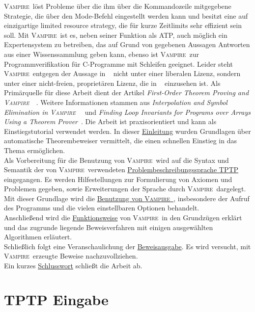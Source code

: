 \documentclass{article}
\newcommand{\vampire}{\textsc{Vampire}~}
\begin{document}
\vampire löst Probleme über die ihm über die Kommandozeile mitgegebene Strategie, die über den Mode-Befehl eingestellt werden kann und besitzt eine auf einzigartige limited resource strategy, die für kurze Zeitlimits sehr effizient sein soll. Mit \vampire ist es, neben seiner Funktion als ATP, auch möglich ein Expertensystem zu betreiben, das auf Grund von gegebenen Aussagen Antworten aus einer Wissenssammlung geben kann, ebenso ist \vampire zur Programmverifikation für C-Programme mit Schleifen geeignet. 
Leider steht \vampire entgegen der Aussage in ~\cite{cav2013} nicht unter einer liberalen Lizenz, sondern unter einer nicht-freien, proprietären Lizenz, die in ~\cite{vampirehp} einzusehen ist.
Als Primärquelle für diese Arbeit dient der Artikel \textit{First-Order Theorem Proving and \vampire}~\cite{cav2013}.
Weitere Informationen stammen aus \textit{Interpolation and Symbol Elimination in \vampire}~\cite{hoder2010} 
und \textit{Finding Loop Invariants for Programs over Arrays Using a Theorem Prover}~\cite{kovacs2009finding}.
Die Arbeit ist praxisorientiert und kann als Einstiegstutorial verwendet werden.
In dieser \hyperref[sec:introduction]{Einleitung} wurden Grundlagen über automatische Theorembeweiser vermittelt, die einen schnellen Einstieg in das Thema ermöglichen.\\
Als Vorbereitung für die Benutzung von \vampire wird auf die Syntax und Semantik der von \vampire verwendeten \hyperref[sec:input]{Problembeschreibungssprache TPTP} eingegangen. Es werden Hilfestellungen zur Formulierung von Axiomen und Problemen gegeben, sowie Erweiterungen der Sprache durch \vampire dargelegt.
Mit dieser Grundlage wird die \hyperref[sec:invocation]{Benutzung von \vampire}, insbesondere der Aufruf des Programms und die vielen einstellbaren Optionen behandelt.\\
Anschließend wird die \hyperref[sec:mechanics]{Funktionsweise} von \vampire in den Grundzügen erklärt und das zugrunde liegende Beweisverfahren mit einigen ausgewählten Algorithmen erläutert.\\
Schließlich folgt eine Veranschaulichung der \hyperref[sec:output]{Beweisausgabe}. Es wird versucht, mit \vampire erzeugte Beweise nachzuvollziehen.\\
Ein kurzes \hyperref[sec:conclusion]{Schlusswort} schließt die Arbeit ab.



\section{TPTP Eingabe}
\label{sec:input}
\end{document}
